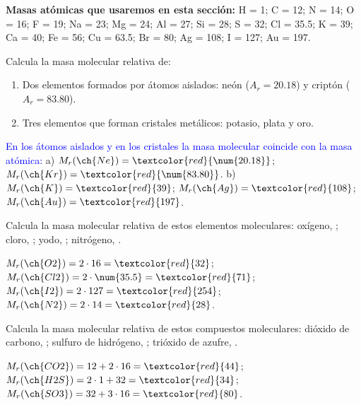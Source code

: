 \begin{remark}
    \textbf{Masas atómicas que usaremos en esta sección:} H = 1; C = 12; N = 14; O = 16; F = 19; Na = 23; Mg = 24; Al = 27; Si = 28; S = 32; Cl = \num{35.5}; K = 39; Ca = 40; Fe = 56; Cu = \num{63.5}; Br = 80; Ag = 108; I = 127; Au = 197.
\end{remark}

\begin{exercise}
    Calcula la masa molecular relativa de:
    \begin{enumerate}[label=\alph*)]
        \item Dos elementos formados por átomos aislados: neón (\(A_r = \num{20.18}\)) y criptón (\(A_r = \num{83.80}\)).
        \item Tres elementos que forman cristales metálicos: potasio, plata y oro.
    \end{enumerate}
    \begin{solu}
        \textcolor{blue}{En los átomos aislados y en los cristales la masa molecular coincide con la masa atómica:}
        a) \(M_r(\ch{Ne}) = \textcolor{red}{\num{20.18}}\); \(M_r(\ch{Kr}) = \textcolor{red}{\num{83.80}}\). b) \(M_r(\ch{K}) = \textcolor{red}{39}\); \(M_r(\ch{Ag}) = \textcolor{red}{108}\); \(M_r(\ch{Au}) = \textcolor{red}{197}\).
    \end{solu}
\end{exercise}

\begin{exercise}
    Calcula la masa molecular relativa de estos elementos moleculares: oxígeno, ; cloro, ; yodo, ; nitrógeno, .
    \begin{solu}
        \(M_r(\ch{O2}) = 2 \cdot 16 = \textcolor{red}{32}\); \(M_r(\ch{Cl2}) = 2 \cdot \num{35.5} = \textcolor{red}{71}\); \(M_r(\ch{I2}) = 2 \cdot 127 = \textcolor{red}{254}\); \(M_r(\ch{N2}) = 2 \cdot 14 = \textcolor{red}{28}\).
    \end{solu}
\end{exercise}

\begin{exercise}
    Calcula la masa molecular relativa de estos compuestos moleculares: dióxido de carbono, ; sulfuro de hidrógeno, ; trióxido de azufre, .
    \begin{solu}
        \(M_r(\ch{CO2}) = 12 + 2 \cdot 16 = \textcolor{red}{44}\); \(M_r(\ch{H2S}) = 2 \cdot 1 + 32 = \textcolor{red}{34}\); \(M_r(\ch{SO3}) = 32 + 3 \cdot 16 = \textcolor{red}{80}\).
    \end{solu}
\end{exercise}

